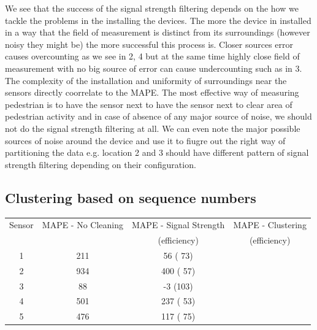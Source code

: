 We see that the success of the signal strength filtering depends on the how we tackle the problems in the installing the devices.
The more the device in installed in a way that the field of measurement is distinct from its surroundings (however noisy they might be) the more successful this process is.
Closer sources error causes overcounting as we see in 2, 4 but at the same time highly close field of measurement with no big source of error can cause undercounting such as in 3. The complexity of the installation and uniformity of surroundings near the sensors directly coorrelate to the MAPE.
The most effective way of measuring pedestrian is to have the sensor next to have the sensor next to clear area of pedestrian activity and in case of absence of any major source of noise, we should not do the signal strength filtering at all. We can even note the major possible sources of noise around the device and use it to fiugre out the right way of partitioning the data e.g. location 2 and 3 should have different pattern of signal strength filtering depending on their configuration.

\subsection{Clustering based on sequence numbers}

\begin{table}
	{\begin{tabular}{cccc} 
		\toprule
			Sensor	& MAPE - No Cleaning & MAPE - Signal Strength	& MAPE - Clustering	\\
					& 					 & (efficiency)				& (efficiency)		\\
		 \midrule
			1 & 211 &  56 ( 73)&	\\
			2 & 934 & 400 ( 57)& 	\\
			3 &  88 &  -3 (103)& 	\\
			4 & 501 & 237 ( 53)& 	\\
			5 & 476 & 117 ( 75)& 	\\
		 \bottomrule
	\end{tabular}}
	\label{errors-table}
\end{table}
